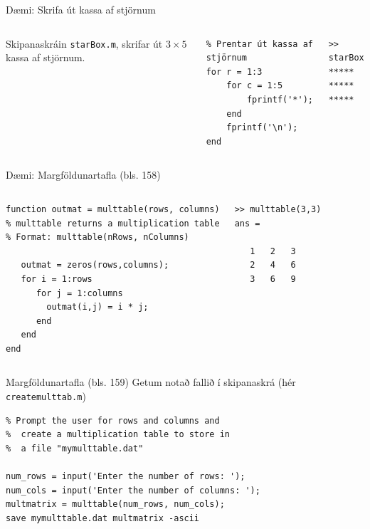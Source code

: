 \documentclass[handout]{beamer}
\begin{document}
\begin{frame}[fragile]{Dæmi: Skrifa út kassa af stjörnum}
\begin{columns}
Skipanaskráin \texttt{starBox.m}, skrifar út $3 \times 5$ kassa af stjörnum.
\begin{verbatim}
% Prentar út kassa af stjörnum
for r = 1:3
    for c = 1:5
        fprintf('*');
    end
    fprintf('\n');
end
\end{verbatim}
\begin{verbatim}
>> starBox
*****
*****
*****
\end{verbatim}
\end{columns}
\end{frame}

\begin{frame}[fragile]{Dæmi: Margföldunartafla (bls. 158)}
\begin{columns}
\begin{verbatim}
function outmat = multtable(rows, columns)
% multtable returns a multiplication table
% Format: multtable(nRows, nColumns)

   outmat = zeros(rows,columns);
   for i = 1:rows
      for j = 1:columns
        outmat(i,j) = i * j;
      end
   end
end
\end{verbatim}
\begin{verbatim}
>> multtable(3,3)
ans =

   1   2   3
   2   4   6
   3   6   9
\end{verbatim}
\end{columns}
\end{frame}

\begin{frame}[fragile]{Margföldunartafla (bls. 159)}
\vspace{\baselineskip}
Getum notað fallið í skipanaskrá (hér \texttt{createmulttab.m})
\begin{verbatim}
% Prompt the user for rows and columns and
%  create a multiplication table to store in
%  a file "mymulttable.dat"
 
num_rows = input('Enter the number of rows: ');
num_cols = input('Enter the number of columns: ');
multmatrix = multtable(num_rows, num_cols);
save mymulttable.dat multmatrix -ascii
\end{verbatim}
\end{frame}
\end{document}

